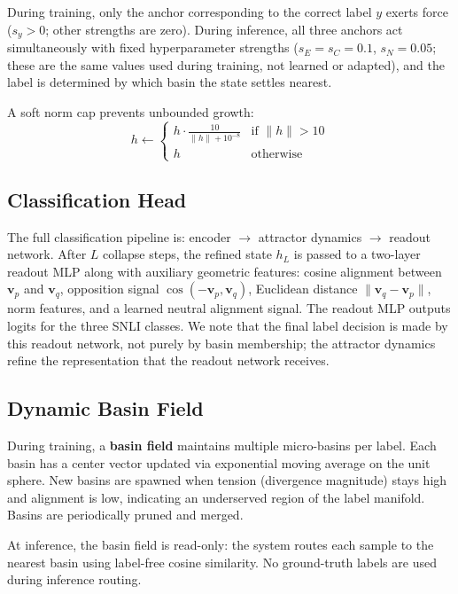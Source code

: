 \documentclass[11pt]{article}
\begin{document}
During training, only the anchor corresponding to the correct label $y$
exerts force ($s_y > 0$; other strengths are zero). During inference,
all three anchors act simultaneously with fixed hyperparameter strengths
($s_E = s_C = 0.1$, $s_N = 0.05$; these are the same values used during
training, not learned or adapted), and the label is determined by which
basin the state settles nearest.

A soft norm cap prevents unbounded growth:
\[
    h \leftarrow \begin{cases}
        h \cdot \frac{10}{\|h\| + 10^{-8}} & \text{if } \|h\| > 10 \\
        h & \text{otherwise}
    \end{cases}
\]

\subsection{Classification Head}

The full classification pipeline is: encoder $\to$ attractor dynamics
$\to$ readout network. After $L$ collapse steps, the refined state
$h_L$ is passed to a two-layer readout MLP along with auxiliary
geometric features: cosine alignment between $\bm{v}_p$ and $\bm{v}_q$,
opposition signal $\cos(-\bm{v}_p, \bm{v}_q)$, Euclidean distance
$\|\bm{v}_q - \bm{v}_p\|$, norm features, and a learned neutral
alignment signal. The readout MLP outputs logits for the three SNLI
classes. We note that the final label decision is made by this readout
network, not purely by basin membership; the attractor dynamics refine
the representation that the readout network receives.

\subsection{Dynamic Basin Field}

During training, a \textbf{basin field} maintains multiple micro-basins
per label. Each basin has a center vector updated via exponential moving
average on the unit sphere. New basins are spawned when tension (divergence
magnitude) stays high and alignment is low, indicating an underserved
region of the label manifold. Basins are periodically pruned and merged.

At inference, the basin field is read-only: the system routes each
sample to the nearest basin using label-free cosine similarity. No
ground-truth labels are used during inference routing.
\end{document}
